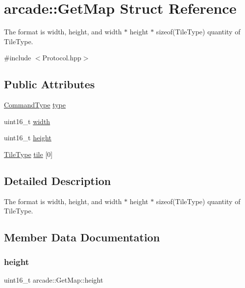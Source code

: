 \hypertarget{structarcade_1_1_get_map}{}\section{arcade\+:\+:Get\+Map Struct Reference}
\label{structarcade_1_1_get_map}


The format is width, height, and width $\ast$ height $\ast$ sizeof(\+Tile\+Type) quantity of Tile\+Type.  




{\ttfamily \#include $<$Protocol.\+hpp$>$}

\subsection*{Public Attributes}
\begin{DoxyCompactItemize}
\item 
\hyperlink{namespacearcade_a23d58aed7310b22b59e2b8f8ff8a5ffd}{Command\+Type} \hyperlink{structarcade_1_1_get_map_a1ea6878b06f00a3d2316dcd974bda8bf}{type}
\item 
uint16\+\_\+t \hyperlink{structarcade_1_1_get_map_a5d7616bd7955157ccdd663c1e0c9efe3}{width}
\item 
uint16\+\_\+t \hyperlink{structarcade_1_1_get_map_ae83569f92aa2a5cc6f50355162c62eb3}{height}
\item 
\hyperlink{namespacearcade_a61ba576694ea309cdf2b4b66902408ca}{Tile\+Type} \hyperlink{structarcade_1_1_get_map_acc3378cf49857df170f302ed959d0dea}{tile} \mbox{[}0\mbox{]}
\end{DoxyCompactItemize}


\subsection{Detailed Description}
The format is width, height, and width $\ast$ height $\ast$ sizeof(\+Tile\+Type) quantity of Tile\+Type. 

\subsection{Member Data Documentation}
\mbox{\label{structarcade_1_1_get_map_ae83569f92aa2a5cc6f50355162c62eb3}} 
\subsubsection{\texorpdfstring{height}{height}}
{\footnotesize\ttfamily uint16\+\_\+t arcade\+::\+Get\+Map\+::height}

